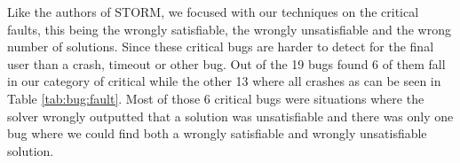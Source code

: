 \label{res:CauseOfBug}
Like the authors of STORM, we focused with our techniques on the critical faults, this being the wrongly satisfiable, the wrongly unsatisfiable and the wrong number of solutions. Since these critical bugs are harder to detect for the final user than a crash, timeout or other bug. Out of the 19 bugs found 6 of them fall in our category of critical while the other 13 where all crashes as can be seen in Table \ref{tab:bug:fault}. Most of those 6 critical bugs were situations where the solver wrongly outputted that a solution was unsatisfiable and there was only one bug where we could find both a wrongly satisfiable and wrongly unsatisfiable solution.

